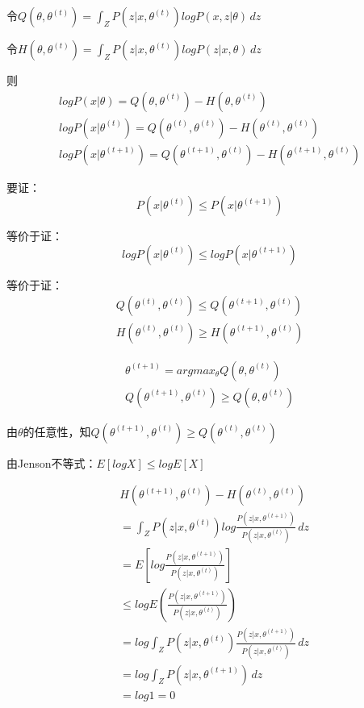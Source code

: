 \documentclass[12pt]{article}
\begin{document}
令$Q(\theta,\theta^{(t)})=\int_{Z} P(z|x,\theta^{(t)}) log P(x,z|\theta) \,dz$

令$H(\theta,\theta^{(t)})=\int_{Z} P(z|x,\theta^{(t)}) log P(z|x,\theta) \,dz$

则
\begin{gather}\nonumber
	log P(x|\theta)=Q(\theta,\theta^{(t)})-H(\theta,\theta^{(t)})\\
    log P(x|\theta^{(t)})=Q(\theta^{(t)},\theta^{(t)})-H(\theta^{(t)},\theta^{(t)})\\
	log P(x|\theta^{(t+1)})=Q(\theta^{(t+1)},\theta^{(t)})-H(\theta^{(t+1)},\theta^{(t)})
\end{gather}

要证：
\begin{equation}\nonumber
	P(x|\theta^{(t)})\leq P(x|\theta^{(t+1)})
\end{equation}

等价于证：
\begin{equation}\nonumber
	log P(x|\theta^{(t)})\leq log P(x|\theta^{(t+1)})
\end{equation}

等价于证：
\begin{gather}\nonumber
	Q(\theta^{(t)},\theta^{(t)})\leq Q(\theta^{(t+1)},\theta^{(t)})\\
	H(\theta^{(t)},\theta^{(t)})\geq H(\theta^{(t+1)},\theta^{(t)})
\end{gather}

\begin{gather}\nonumber
	\theta^{(t+1)}=arg max_\theta Q(\theta,\theta^{(t)})\\
	Q(\theta^{(t+1)},\theta^{(t)})\geq Q(\theta,\theta^{(t)})
\end{gather}

由$\theta$的任意性，知$Q(\theta^{(t+1)},\theta^{(t)})\geq Q(\theta^{(t)},\theta^{(t)})$

由Jenson不等式：$E[log X]\leq log E[X]$

\begin{align}\nonumber
	&H(\theta^{(t+1)},\theta^{(t)})-H(\theta^{(t)},\theta^{(t)})\\
	&=\int_{Z} P(z|x,\theta^{(t)}) log \frac{P(z|x,\theta^{(t+1)})}{P(z|x,\theta^{(t)})} \,dz\\
	&=E[log \frac{P(z|x,\theta^{(t+1)})}{P(z|x,\theta^{(t)})}]\\
	&\leq log E(\frac{P(z|x,\theta^{(t+1)})}{P(z|x,\theta^{(t)})})\\
	&=log \int_{Z} P(z|x,\theta^{(t)}) \frac{P(z|x,\theta^{(t+1)})}{P(z|x,\theta^{(t)})} \,dz\\
	&=log \int_{Z} P(z|x,\theta^{(t+1)})  \,dz\\
	&=log 1=0
\end{align}
\end{document}
